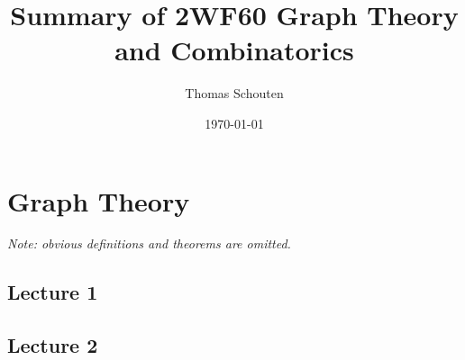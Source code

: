 \documentclass{report}
\title{Summary of 2WF60 Graph Theory and Combinatorics}
\author{Thomas Schouten}
\date{\today}
\begin{document}
    \maketitle
    \tableofcontents

    \chapter*{Graph Theory}\label{ch:graphTheory}
    \textsl{Note: obvious definitions and theorems are omitted.}

    \section{Lecture 1}\label{sec:lecture1}
    

    \section{Lecture 2}
    

    \printindex
\end{document}
